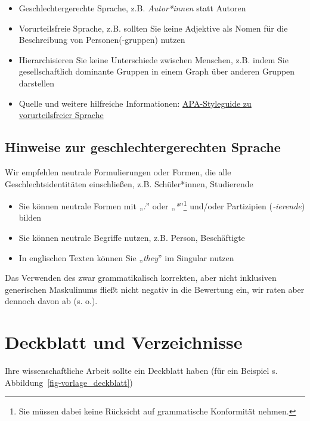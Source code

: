 \documentclass[
  letterpaper,
  DIV=11]{scrreprt}
\begin{document}
\begin{itemize}
\item
  Geschlechtergerechte Sprache, z.B. \emph{Autor*innen} statt Autoren
\item
  Vorurteilsfreie Sprache, z.B. sollten Sie keine Adjektive als Nomen
  für die Beschreibung von Personen(-gruppen) nutzen
\item
  Hierarchisieren Sie keine Unterschiede zwischen Menschen, z.B. indem
  Sie gesellschaftlich dominante Gruppen in einem Graph über anderen
  Gruppen darstellen
\item
  Quelle und weitere hilfreiche Informationen:
  \href{https://apastyle.apa.org/style-grammar-guidelines/bias-free-language/general-principles}{APA-Styleguide
  zu vorurteilsfreier Sprache}
\end{itemize}

\subsection{Hinweise zur geschlechtergerechten
Sprache}\label{hinweise-zur-geschlechtergerechten-sprache}

Wir empfehlen neutrale Formulierungen oder Formen, die alle
Geschlechtsidentitäten einschließen, z.B. Schüler*innen, Studierende

\begin{itemize}
\item
  Sie können neutrale Formen mit „\emph{:}'' oder „\emph{*}''\footnote{Sie
    müssen dabei keine Rücksicht auf grammatische Konformität nehmen.}
  und/oder Partizipien (\emph{‑ierende}) bilden
\item
  Sie können neutrale Begriffe nutzen, z.B. Person, Beschäftigte
\item
  In englischen Texten können Sie „\emph{they}'' im Singular nutzen
\end{itemize}

Das Verwenden des zwar grammatikalisch korrekten, aber nicht inklusiven
generischen Maskulinums fließt nicht negativ in die Bewertung ein, wir
raten aber dennoch davon ab (s. o.).

\section{Deckblatt und Verzeichnisse}\label{deckblatt-und-verzeichnisse}

Ihre wissenschaftliche Arbeit sollte ein Deckblatt haben (für ein
Beispiel s. Abbildung~\ref{fig-vorlage_deckblatt})
\end{document}
